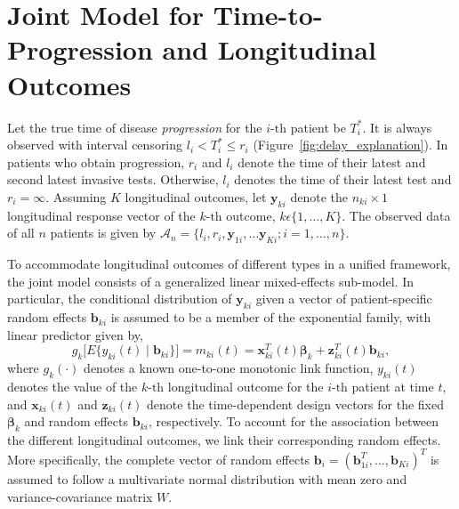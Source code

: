 \section{Joint Model for Time-to-Progression and Longitudinal Outcomes}
\label{sec:jointmodel}
Let the true time of disease \textit{progression} for the ${i\mbox{-th}}$ patient be $T_i^*$. It is always observed with interval censoring ${l_i < T_i^* \leq r_i}$ (Figure~\ref{fig:delay_explanation}). In patients who obtain progression, $r_i$ and $l_i$ denote the time of their latest and second latest invasive tests. Otherwise, $l_i$ denotes the time of their latest test and ${r_i=\infty}$. Assuming $K$ longitudinal outcomes, let $\boldsymbol{y}_{ki}$ denote the ${n_{ki} \times 1}$ longitudinal response vector of the ${k\mbox{-th}}$ outcome, $k\epsilon\{1, \ldots, K\}$. The observed data of all $n$ patients is given by ${\mathcal{A}_n = \{l_i, r_i, \boldsymbol{y}_{1i},\ldots \boldsymbol{y}_{Ki}; i = 1, \ldots, n\}}$.

To accommodate longitudinal outcomes of different types in a unified framework, the joint model consists of a generalized linear mixed-effects sub-model. In particular, the conditional
distribution of $\boldsymbol{y}_{ki}$ given a vector of patient-specific random effects $\boldsymbol{b}_{ki}$ is assumed to be a member of the exponential family, with linear predictor given by,
\begin{equation}
\label{eq:long_model}
g_k\big[E\{y_{ki} (t) \mid \boldsymbol{b}_{ki}\}\big] = m_{ki}(t) = \boldsymbol{x}_{ki}^T(t)\boldsymbol{\beta}_{k} + \boldsymbol{z}_{ki}^T(t)\boldsymbol{b}_{ki},
\end{equation}
where $g_k(\cdot)$ denotes a known one-to-one monotonic link function, $y_{ki}(t)$ denotes the
value of the ${k\mbox{-th}}$ longitudinal outcome for the ${i\mbox{-th}}$ patient at time $t$, and $\boldsymbol{x}_{ki}(t)$ and $\boldsymbol{z}_{ki}(t)$ denote the time-dependent design vectors for the fixed $\boldsymbol{\beta}_{k}$ and random effects $\boldsymbol{b}_{ki}$, respectively. To account for the association between the different longitudinal outcomes, we link their corresponding random effects. More specifically, the complete vector of random effects ${\boldsymbol{b}_{i} = (\boldsymbol{b}_{1i}^T, \ldots, \boldsymbol{b}_{Ki})^T}$ is assumed to follow a multivariate normal distribution with mean zero and variance-covariance matrix $W$.


